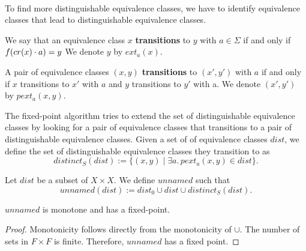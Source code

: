 \paragraph{}
To find more distinguishable equivalence classes, we have to identify equivalence classes that lead to distinguishable equivalence classes. 
\begin{definition}
    We say that an equivalence class $x$ \textbf{transitions} to $y$ with $a \in \Sigma$ if and only if
        $f (cr(x)\cdot a) = y$
    We denote $y$ by $\mathit{ext_a}(x)$.
\end{definition}
    
\begin{definition}
    A pair of equivalence classes $(x,y)$ \textbf{transitions} to $(x', y')$ with $a$ if and only if $x$ transitions to $x'$ with $a$ and $y$ transitions to $y'$ with a.
    We denote $(x', y')$ by $\mathit{pext_a}(x,y)$.
\end{definition}

The fixed-point algorithm tries to extend the set of distinguishable equivalence classes by looking for a pair of equivalence classes that transitions to a pair of distinguishable equivalence classes. 
Given a set of of equivalence classes $\mathit{dist}$, we define the set of distinguishable equivalence classes they transition to as
\begin{equation*}
    \mathit{distinct_S}(\mathit{dist}) := \{ (x,y) \; | \; \exists a. \, \mathit{pext_a}(x,y) \in \mathit{dist}\}.
\end{equation*}

\begin{definition}
    \label{unnamed}
    Let $\mathit{dist}$ be a subset of $X \times X$. We define $\mathit{unnamed}$ such that
    \begin{equation*}
        \mathit{unnamed}(\mathit{dist}) := \mathit{dist_0} \cup \mathit{dist} \cup \mathit{distinct_S}(\mathit{dist}).
    \end{equation*}
\end{definition}






\begin{lemma}
    \label{dist_monotone}
    $unnamed$ is monotone and has a fixed-point.
\end{lemma}
\begin{proof}
    Monotonicity follows directly from the monotonicity of $\cup$. 
    The number of sets in $F \times F$ is finite. 
    Therefore, $unnamed$ has a fixed point.

\end{proof}
